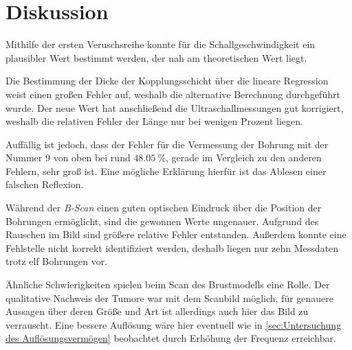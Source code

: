 \section{Diskussion}
\label{sec:Diskussion}
Mithilfe der ersten Veruschsreihe konnte für die Schallgeschwindigkeit ein plausibler
Wert bestimmt werden, der nah am theoretischen Wert liegt.

Die Bestimmung der Dicke der Kopplungsschicht über die lineare Regression weist einen großen Fehler auf,
weshalb die alternative Berechnung durchgeführt wurde.
Der neue Wert hat anschließend die Ultraschallmessungen gut korrigiert, weshalb die relativen
Fehler der Länge nur bei wenigen Prozent liegen.

Auffällig ist jedoch, dass der Fehler für die Vermessung der Bohrung mit der Nummer 9 von oben bei rund $\qty{48,05}{\percent}$, gerade 
im Vergleich zu den anderen Fehlern, sehr groß ist. Eine mögliche Erklärung hierfür ist das Ablesen einer falschen Reflexion.

Während der \textit{B-Scan} einen guten optischen Eindruck über die Position der Bohrungen ermöglicht,
sind die gewonnen Werte ungenauer. Aufgrund des Rauschen im Bild sind größere relative Fehler entstanden.
Außerdem konnte eine Fehlstelle nicht korrekt identifiziert werden, deshalb liegen nur zehn Messdaten
trotz elf Bohrungen vor.

Ähnliche Schwierigkeiten spielen beim Scan des Brustmodells eine Rolle. Der qualitative Nachweis der Tumore
war mit dem Scanbild möglich, für genauere Aussagen über deren Größe und Art ist allerdings auch hier das
Bild zu verrauscht. Eine bessere Auflösung wäre hier eventuell wie in \ref{sec:Untersuchung des Auflösungsvermögen}
beobachtet durch Erhöhung der Frequenz erreichbar.